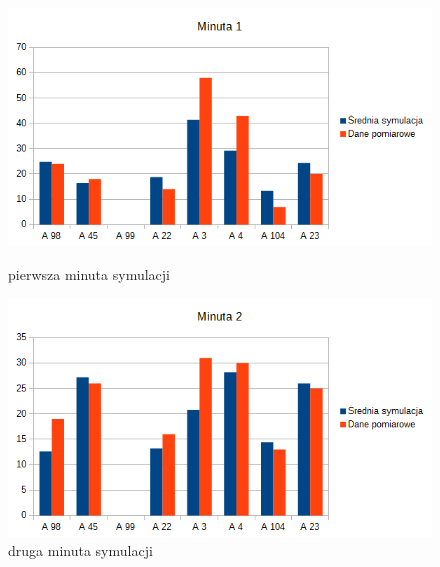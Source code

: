 \documentclass[a4paper,12pt]{article}
\begin{document}
\newpage
\begin{figure}[!h]
    \centering
    \begin{minipage}{0.5\textwidth}
        \centering
        \includegraphics[width=\textwidth]{min1.png} %
        \caption{pierwsza minuta symulacji}
        \label{fig:1m}
    \end{minipage}\hfill
    \begin{minipage}{0.5\textwidth}
        \centering
        \includegraphics[width=\textwidth]{min2.png} %
        \caption{druga minuta symulacji}
        \label{fig:2m}
    \end{minipage}
\end{figure}
\end{document}
